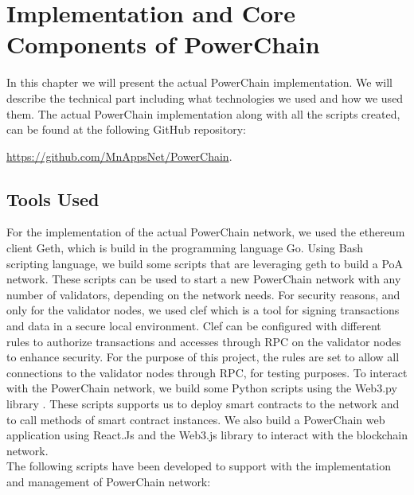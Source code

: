 \chapter{Implementation and Core Components of PowerChain} \label{platform}
\label{chapter5}
In this chapter we will present the actual PowerChain implementation. We will describe the technical part including what technologies we used and how we used them.
The actual PowerChain implementation along with all the scripts created, can be found at the following GitHub repository:
\begin{center}
    \url{https://github.com/MnAppsNet/PowerChain}.
    \label{code}
\end{center}

\section{Tools Used}
For the implementation of the actual PowerChain network, we used the ethereum client Geth, which is build in the programming language Go.\cite{geth}
Using Bash scripting language, we build some scripts that are leveraging geth to build a PoA network. These scripts can be used to start a new PowerChain network with any number of validators, depending on the network needs.
For security reasons, and only for the validator nodes, we used clef \cite{clef} which is a tool for signing transactions and data in a secure local environment. Clef can be configured with different rules
to authorize transactions and accesses through RPC on the validator nodes to enhance security. For the purpose of this project, the rules are set to allow all connections to the validator nodes through RPC, for testing purposes.
To interact with the PowerChain network, we build some Python scripts using the Web3.py library \cite{Web3py}. These scripts supports us to deploy smart contracts to the network and to call methods of smart contract
instances. We also build a PowerChain web application using React.Js \cite{Reactjs} and the Web3.js \cite{Web3js} library to interact with the blockchain network.\\
The following scripts have been developed to support with the implementation and management of PowerChain network:\\

